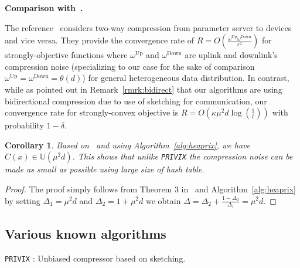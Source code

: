 \documentclass[twoside]{article}
\newtheorem{corollary}{Corollary}
\begin{document}
\textbf{Comparison with~\cite{philippenko2020artemis}.} 

The reference~\cite{philippenko2020artemis} considers two-way compression from parameter server to devices and vice versa. They provide the convergence rate of $R=O\left(\frac{\omega^{\text{Up}}\omega^{\text{Down}}}{\epsilon^2}\right)$ for strongly-objective functions where $\omega^{\text{Up}}$ and $\omega^{\text{Down}}$ are uplink and downlink's compression noise (specializing to our case for the sake of comparison $\omega^{\text{Up}}=\omega^{\text{Down}}=\theta\left(d\right)$) for general heterogeneous data distribution. In contrast, while as pointed out in Remark~\ref{rmrk:bidirect} that our algorithms are using bidirectional compression due to use of sketching for communication, our convergence rate for strongly-convex objective is $R=O(\kappa\mu^2d\log\left(\frac{1}{\epsilon}\right))$ with probability $1-\delta$.  




\begin{corollary}
Based on~\cite[Theorem 3]{horvath2020better} and using Algorithm~\ref{alg:heaprix}, we have $C(x)\in \mathbb{U}(\mu^2 d)$. This shows that unlike \texttt{PRIVIX} the compression noise can be made as small as possible using large size of hash table.
\end{corollary}

\begin{proof}
The proof simply follows from Theorem 3 in~\cite{horvath2020better} and Algorithm~\ref{alg:heaprix} by setting $\Delta_1=\mu^2d$ and $\Delta_2=1+\mu^2d$ we obtain $\Delta=\Delta_2+\frac{1-\Delta_2}{\Delta_1}=\mu^2d$.
\end{proof}


\subsection{Various known algorithms}

\begin{algorithm}[H]
\caption{\texttt{PRIVIX} \cite{li2019privacy}: Unbiased compressor based on sketching. }\label{Alg:privix}
\begin{algorithmic}[1]
\vspace{- 0.1cm}
\end{algorithmic}
\end{algorithm}
\end{document}
